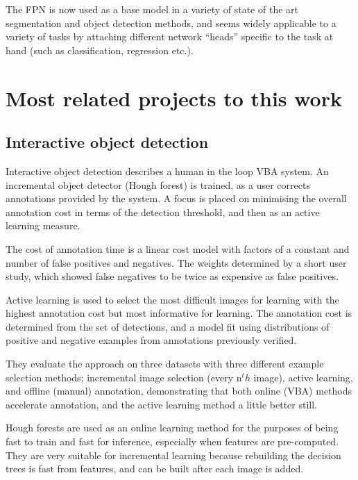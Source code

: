 The \gls{FPN} is now used as a base model in a variety of state of the art segmentation and object detection methods, and seems widely applicable to a variety of tasks by attaching different network ``heads'' specific to the task at hand (such as classification, regression etc.).




\section {Most related projects to this work}
\label{sec:closest}

\subsection {Interactive object detection \cite{Yao2012}}

Interactive object detection \cite{Yao2012} describes a human in the loop \gls{VBA} system. An incremental object detector (Hough forest) is trained, as a user corrects annotations provided by the system. A focus is placed on minimising the overall annotation cost in terms of the detection threshold, and then as an active learning measure. 

The cost of annotation time is a linear cost model with factors of a constant and number of false positives and negatives. The weights determined by a short user study, which showed false negatives to be twice as expensive as false positives. 

Active learning is used to select the most difficult images for learning with the highest annotation cost but most informative for learning. The annotation cost is determined from the set of detections, and a model fit using distributions of positive and negative examples from annotations previously verified. 

They evaluate the approach on  three datasets with three different example selection methods; incremental image selection (every n$^th$ image), active learning, and offline (manual) annotation, demonstrating that both online (\gls{VBA}) methods accelerate annotation, and the active learning method a little better still.

Hough forests \cite{Gall2011} are used as an online learning method for the purposes of being fast to train and fast for inference, especially when features are pre-computed. They are very suitable for incremental learning because rebuilding the decision trees is fast from features, and can be built after each image is added. 


